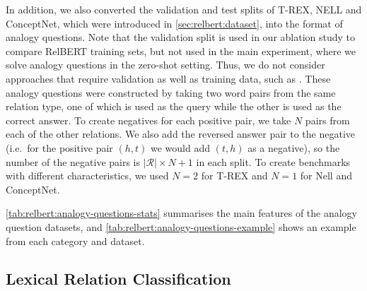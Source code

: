 \documentclass[3p]{elsarticle}
\begin{document}
{\begin{description}
\end{description}
In addition, we also converted the validation and test splits of T-REX, NELL and ConceptNet, which were introduced in \autoref{sec:relbert:dataset}, into the format of analogy questions. Note that the validation split is used in our ablation study to compare RelBERT training sets, but not used in the main experiment, where we solve analogy questions in the zero-shot setting. Thus, we do not consider approaches that require validation as well as training data, such as \cite{ushio-etal-2021-bert}.
These analogy questions were constructed by taking two word pairs from the same relation type, one of which is used as the query while the other is used as the correct answer. To create negatives for each positive pair, we take $N$ pairs from each of the other relations. We also add the reversed answer pair to the negative (i.e.\ for the positive pair $(h,t)$ we would add $(t,h)$ as a negative), so the number of the negative pairs is $|\mathcal{R}| \times N + 1$ in each split. 
To create benchmarks with different characteristics, we used $N=2$ for T-REX and $N=1$ for Nell and ConceptNet.

\autoref{tab:relbert:analogy-questions-stats} summarises the main features of the analogy question datasets, and \autoref{tab:relbert:analogy-questions-example} shows an example from each category and dataset.

\subsection{Lexical Relation Classification}\label{sec:lexcal-relation-classification}

}
\end{document}
